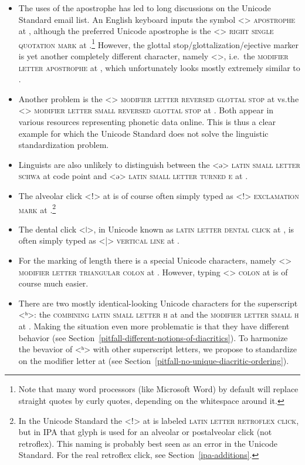 \begin{itemize}

   \item The uses of the apostrophe has led to long discussions on the Unicode
        Standard email list. An English keyboard inputs the symbol
        <> \textsc{apostrophe} at , although the preferred Unicode
        apostrophe is the <> \textsc{right single quotation mark} at
        .\footnote{Note that many word processors (like Microsoft
        Word) by default will replace straight quotes by curly quotes,
        depending on the whitespace around it.} However, the glottal
        stop/glottalization/ejective marker is yet another completely different
        character, namely <>, i.e.~the \textsc{modifier letter apostrophe} 
        at , which unfortunately looks mostly extremely similar to
        . 
  \item Another problem is the <> \textsc{modifier letter reversed glottal
        stop} at  vs.\@ the <> \textsc{modifier letter small reversed
        glottal stop} at . Both appear in various resources
        representing phonetic data online. This is thus a clear example for
        which the Unicode Standard does not solve the linguistic standardization
        problem.
  \item Linguists are also unlikely to distinguish between the <ə>
        \textsc{latin small letter schwa} at code point  and <ǝ>
        \textsc{latin small letter turned e} at .
  \item The alveolar click <ǃ> at  is of course often simply
        typed as <!> \textsc{exclamation mark} at .\footnote{In the
        Unicode Standard the <ǃ> at  is labeled \textsc{latin letter
        retroflex click}, but in IPA that glyph is used for an alveolar or
        postalveolar click (not retroflex). This naming is probably best seen as
        an error in the Unicode Standard. For the real retroflex click, see 
        Section~\ref{ipa-additions}.}
  \item The dental click <ǀ>, in Unicode known as \textsc{latin letter dental
        click} at , is often simply typed as <|> \textsc{vertical
        line} at .
  \item For the marking of length there is a special Unicode characters, namely
        <> \textsc{modifier letter triangular colon} at . However,
        typing <> \textsc{colon} at  is of course much easier.        
  \item There are two mostly identical-looking Unicode characters for the superscript
        <ʰ>: the \textsc{combining latin small letter h} at  and the
        \textsc{modifier letter small h} at . Making the situation 
        even more problematic is that they have different behavior (see 
        Section~\ref{pitfall-different-notions-of-diacritics}). To harmonize the 
        bevavior of <ʰ> with other superscript letters, we propose to 
        standardize on the modifier letter at  (see 
        Section~\ref{pitfall-no-unique-diacritic-ordering}).
  

\end{itemize}
